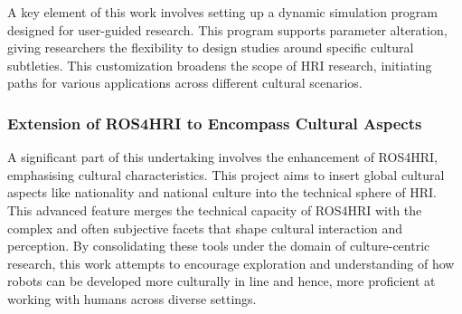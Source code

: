 A key element of this work involves setting up a dynamic simulation program designed for user-guided research. This program supports parameter alteration, giving researchers the flexibility to design studies around specific cultural subtleties. This customization broadens the scope of HRI research, initiating paths for various applications across different cultural scenarios.

\subsubsection{Extension of ROS4HRI to Encompass Cultural Aspects}

A significant part of this undertaking involves the enhancement of ROS4HRI, emphasising cultural characteristics. This project aims to insert global cultural aspects like nationality and national culture into the technical sphere of HRI. This advanced feature merges the technical capacity of ROS4HRI with the complex and often subjective facets that shape cultural interaction and perception.
By consolidating these tools under the domain of culture-centric research, this work attempts to encourage exploration and understanding of how robots can be developed more culturally in line and hence, more proficient at working with humans across diverse settings.